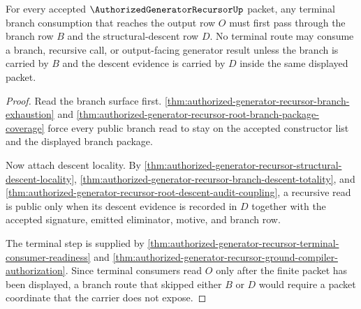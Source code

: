 \begin{theorem}
\label{thm:authorized-generator-recursor-terminal-branch-descent-exactness}
For every accepted $\AuthorizedGeneratorRecursorUp$ packet, any terminal branch consumption that reaches the output row $O$ must first pass through the branch row $B$ and the structural-descent row $D$. No terminal route may consume a branch, recursive call, or output-facing generator result unless the branch is carried by $B$ and the descent evidence is carried by $D$ inside the same displayed packet.
\end{theorem}
\begin{proof}
Read the branch surface first. \autoref{thm:authorized-generator-recursor-branch-exhaustion} and \autoref{thm:authorized-generator-recursor-root-branch-package-coverage} force every public branch read to stay on the accepted constructor list and the displayed branch package.

Now attach descent locality. By \autoref{thm:authorized-generator-recursor-structural-descent-locality}, \autoref{thm:authorized-generator-recursor-branch-descent-totality}, and \autoref{thm:authorized-generator-recursor-root-descent-audit-coupling}, a recursive read is public only when its descent evidence is recorded in $D$ together with the accepted signature, emitted eliminator, motive, and branch row.

The terminal step is supplied by \autoref{thm:authorized-generator-recursor-terminal-consumer-readiness} and \autoref{thm:authorized-generator-recursor-ground-compiler-authorization}. Since terminal consumers read $O$ only after the finite packet has been displayed, a branch route that skipped either $B$ or $D$ would require a packet coordinate that the carrier does not expose.
\end{proof}


